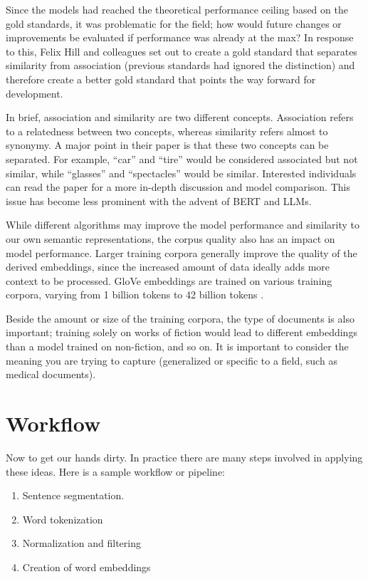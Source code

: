 Since the models had reached the theoretical performance ceiling based on the gold standards, it was problematic for the field; how would future changes or improvements be evaluated if performance was already at the max?
In response to this, Felix Hill and colleagues \cite{hill2015simlex} set out to create a gold standard that separates similarity from association (previous standards had ignored the distinction) and therefore create a better gold standard that points the way forward for development. 

In brief, association and similarity are two different concepts. Association refers to a relatedness between two concepts, whereas similarity refers almost to synonymy. A major point in their paper \cite{hill2015simlex} is that these two concepts can be separated.
For example, ``car'' and ``tire'' would be considered associated but not similar, while ``glasses'' and ``spectacles'' would be similar.
Interested individuals can read the paper for a more in-depth discussion and model comparison. This issue has become less prominent with the advent of BERT and LLMs.

While different algorithms may improve the model performance and similarity to our own semantic representations, the corpus quality also has an impact on model performance.
Larger training corpora generally improve the quality of the derived embeddings, since the increased amount of data ideally adds more context to be processed. 
GloVe embeddings are trained on various training corpora, varying from 1 billion tokens to 42 billion tokens \cite{pennington2014glove}.

Beside the amount or size of the training corpora, the type of documents is also important; training solely on works of fiction would lead to different embeddings than a model trained on non-fiction, and so on. It is important to consider the meaning you are trying to capture (generalized or specific to a field, such as medical documents).

\section{Workflow}

Now to get our hands dirty. In practice there are many steps involved in applying these ideas. 
Here is a sample workflow or pipeline:
\begin{enumerate}
\item Sentence segmentation.
\item Word tokenization
\item Normalization and filtering
\item Creation of word embeddings
\end{enumerate}

